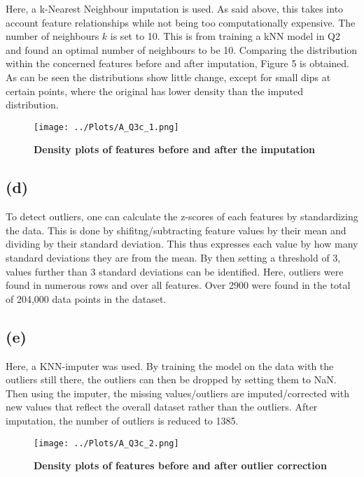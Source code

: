 \documentclass[12pt]{report} %
\begin{document}
Here, a k-Nearest Neighbour imputation is used. As said above, this takes into account feature relationships while not being too computationally expensive. The number of neighbours $k$ is set to 10. This is from training a kNN model in Q2 and found an optimal number of neighbours to be 10. Comparing the distribution within the concerned features before and after imputation, Figure 5 is obtained. As can be seen the distributions show little change, except for small dips at certain points, where the original has lower density than the imputed distribution.


\begin{figure}[htbp]
    \centering
    \texttt{[image: ../Plots/A\_Q3c\_1.png]}
    \caption{\textbf{Density plots of features before and after the imputation}}
\end{figure}

\subsection*{(d)}

To detect outliers, one can calculate the z-scores of each features by standardizing the data. This is done by shifitng/subtracting feature values by their mean and dividing by their standard deviation\cite[p. 73]{sklearn_book}. This thus expresses each value by how many standard deviations they are from the mean. By then setting a threshold of 3, values further than 3 standard deviations can be identified. Here, outliers were found in numerous rows and over all features. Over 2900 were found in the total of 204,000 data points in the dataset.

\subsection*{(e)}

Here, a KNN-imputer was used. By training the model on the data with the outliers still there, the outliers can then be dropped by setting them to NaN. Then using the imputer, the missing values/outliers are imputed/corrected with new values that reflect the overall dataset rather than the outliers. After imputation, the number of outliers is reduced to 1385. 

\begin{figure}[htbp]
    \centering
    \texttt{[image: ../Plots/A\_Q3c\_2.png]}
    \caption{\textbf{Density plots of features before and after outlier correction}}
\end{figure}
\end{document}
